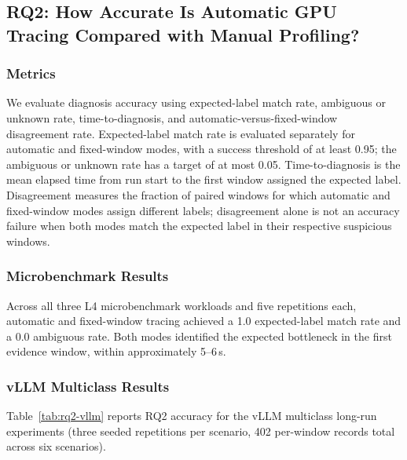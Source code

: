 \subsection{RQ2: How Accurate Is Automatic GPU Tracing Compared with Manual Profiling?}

\subsubsection{Metrics}

We evaluate diagnosis accuracy using expected-label match rate, ambiguous or unknown rate, time-to-diagnosis, and automatic-versus-fixed-window disagreement rate. Expected-label match rate is evaluated separately for automatic and fixed-window modes, with a success threshold of at least 0.95; the ambiguous or unknown rate has a target of at most 0.05. Time-to-diagnosis is the mean elapsed time from run start to the first window assigned the expected label. Disagreement measures the fraction of paired windows for which automatic and fixed-window modes assign different labels; disagreement alone is not an accuracy failure when both modes match the expected label in their respective suspicious windows.

\subsubsection{Microbenchmark Results}

Across all three L4 microbenchmark workloads and five repetitions each, automatic and fixed-window tracing achieved a 1.0 expected-label match rate and a 0.0 ambiguous rate. Both modes identified the expected bottleneck in the first evidence window, within approximately 5--6\,s.

\subsubsection{vLLM Multiclass Results}

Table~\ref{tab:rq2-vllm} reports RQ2 accuracy for the vLLM multiclass long-run experiments (three seeded repetitions per scenario, 402 per-window records total across six scenarios).

